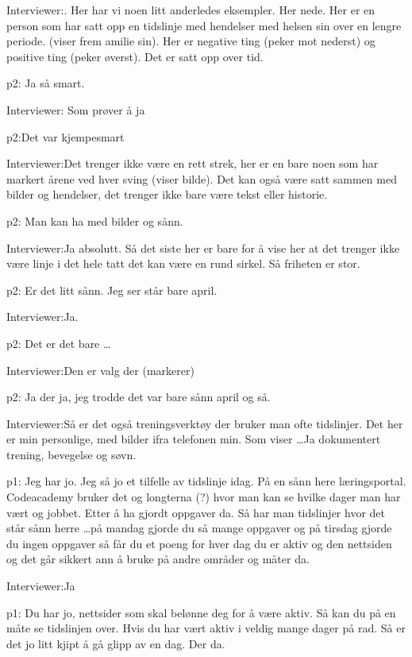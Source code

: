 \documentclass[../../MasterThesis.tex]{subfiles}
\begin{document}
\textcolor{myBlue} {Interviewer:}. Her har vi noen litt anderledes eksempler. Her nede. Her er en person som har satt opp en tidslinje med hendelser med helsen sin over en lengre periode. (viser frem amilie sin). Her er negative ting (peker mot nederst) og positive ting (peker øverst). Det er satt opp over tid.

\textcolor{myYellow} {p2:} Ja så smart.

\textcolor{myBlue} {Interviewer:} Som prøver å ja

\textcolor{myYellow} {p2:}Det var kjempesmart

\textcolor{myBlue} {Interviewer:}Det trenger ikke være en rett strek, her er en bare noen som har markert årene ved hver sving (viser bilde). Det kan også være satt sammen med bilder og hendelser, det trenger ikke bare være tekst eller historie. 

\textcolor{myYellow} {p2:} Man kan ha med bilder og sånn. 

\textcolor{myBlue} {Interviewer:}Ja absolutt. Så det siste her er bare for å vise her at det trenger ikke være linje i det hele tatt det kan være en rund sirkel. Så friheten er stor.

\textcolor{myYellow} {p2:} Er det litt sånn. Jeg ser står bare april. 

\textcolor{myBlue} {Interviewer:}Ja.

\textcolor{myYellow} {p2:} Det er det bare \dots

\textcolor{myBlue} {Interviewer:}Den er valg der (markerer)

\textcolor{myYellow} {p2:} Ja der ja, jeg trodde det var bare sånn april og så. 

\textcolor{myBlue} {Interviewer:}Så er det også treningsverktøy der bruker man ofte tidslinjer. Det her er min personlige, med bilder ifra telefonen min. Som viser \dots Ja dokumentert trening, bevegelse og søvn.

\textcolor{myGreen} {p1:} Jeg har jo. Jeg så jo et tilfelle av tidslinje idag. På en sånn here læringsportal. Codeacademy bruker det og longterna (?) hvor man kan se hvilke dager man har vært og jobbet. Etter å ha gjordt oppgaver da. Så har man tidslinjer hvor det står sånn herre \dots på mandag gjorde du så mange oppgaver og på tirsdag gjorde du ingen oppgaver så får du et poeng for hver dag du er aktiv og den nettsiden og det går sikkert ann å bruke på andre områder og måter da.

\textcolor{myBlue} {Interviewer:}Ja 

\textcolor{myGreen} {p1:} Du har jo, nettsider som skal belønne deg for å være aktiv. Så kan du på en måte se tidslinjen over. Hvis du har vært aktiv i veldig mange dager på rad. Så er det jo litt kjipt å gå glipp av en dag. Der da.
\end{document}
